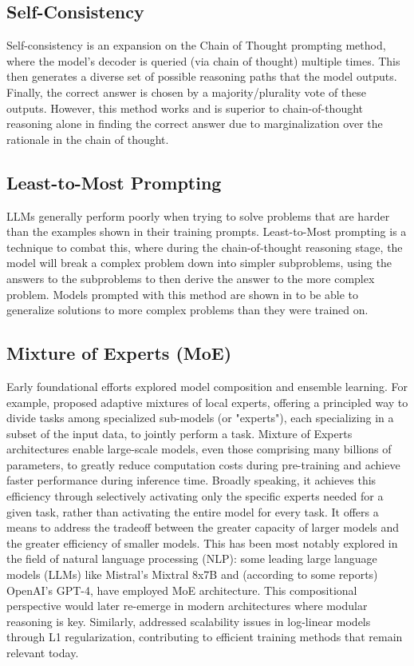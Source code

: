 \subsection{Self-Consistency}
Self-consistency \citet{wang2023selfconsistencyimproveschainthought} is an expansion on the Chain of Thought \cite{wei2023chainofthoughtpromptingelicitsreasoning} prompting method, where the model's decoder is queried (via chain of thought) multiple times. This then generates a diverse set of possible reasoning paths that the model outputs. Finally, the correct answer is chosen by a majority/plurality vote of these outputs. However, this method works and is superior to chain-of-thought reasoning alone in finding the correct answer due to marginalization over the rationale in the chain of thought.

\subsection{Least-to-Most Prompting}
LLMs generally perform poorly when trying to solve problems that are harder than the examples shown in their training prompts. Least-to-Most \citet{zhou2023leasttomostpromptingenablescomplex} prompting is a technique to combat this, where during the chain-of-thought reasoning stage, the model will break a complex problem down into simpler subproblems, using the answers to the subproblems to then derive the answer to the more complex problem. Models prompted with this method are shown in \cite{zhou2023leasttomostpromptingenablescomplex} to be able to generalize solutions to more complex problems than they were trained on.

\subsection{Mixture of Experts (MoE)}
Early foundational efforts explored model composition and ensemble learning. For example, \citet{jacobs1991adaptivemixtureoflocalexperts} proposed adaptive mixtures of local experts, offering a principled way to divide tasks among specialized sub-models (or "experts"), each specializing in a subset of the input data, to jointly perform a task. Mixture of Experts architectures enable large-scale models, even those comprising many billions of parameters, to greatly reduce computation costs during pre-training and achieve faster performance during inference time. Broadly speaking, it achieves this efficiency through selectively activating only the specific experts needed for a given task, rather than activating the entire model for every task. It offers a means to address the tradeoff between the greater capacity of larger models and the greater efficiency of smaller models. This has been most notably explored in the field of natural language processing (NLP): some leading large language models (LLMs) like Mistral’s Mixtral 8x7B and (according to some reports) OpenAI’s GPT-4, have employed MoE architecture. This compositional perspective would later re-emerge in modern architectures where modular reasoning is key. Similarly, \citet{andrew2007scalable} addressed scalability issues in log-linear models through L1 regularization, contributing to efficient training methods that remain relevant today.


